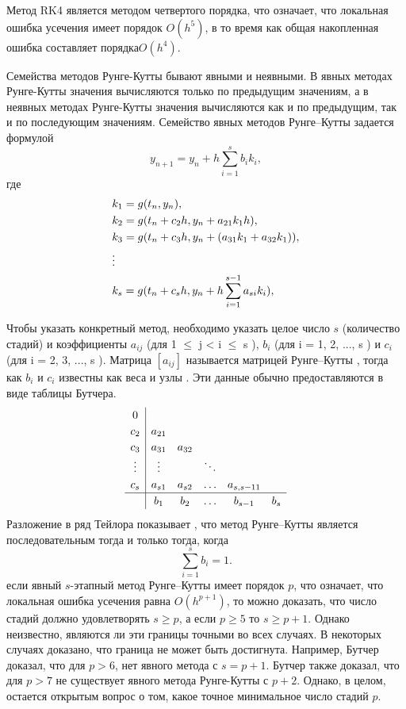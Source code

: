 \documentclass[a4paper,12pt]{article}
\begin{document}
	Метод RK4 является методом четвертого порядка, что означает, что локальная ошибка усечения имеет порядок \(O(h^{5})\), в то время как общая накопленная ошибка составляет порядка\(O(h^{4})\).
	
	Семейства методов Рунге-Кутты бывают явными и неявными. В явных методах Рунге-Кутты значения вычисляются только по предыдущим значениям, а в неявных методах Рунге-Кутты значения вычисляются как и по предыдущим, так и по последующим значениям. Семейство явных методов Рунге–Кутты задается формулой
	\begin{equation}\label{eq:2} 
		y_{n+1}=y_n+h\sum_{i=1}^{s}b_ik_i,
	\end{equation}
	где
	\begin{equation}\label{eq:2} 
		\begin{lgathered} 
			k_1=g(t_n, y_n),\\
			k_2=g(t_n+c_2h, y_n+a_{21}k_1h),\\
			k_3=g(t_n+c_3h, y_n+(a_{31}k_1+a_{32}k_1)),\\
			\vdots\\
			k_s=g(t_n+c_sh, y_n+h\sum_{i=1}^{s-1}a_{si}k_i),\\
		\end{lgathered}
	\end{equation}
	
	Чтобы указать конкретный метод, необходимо указать целое число \(s\) (количество стадий) и коэффициенты \(a_{ij}\) (для 1 \(\leq\) j < i \(\leq\) s ), \(b_i\) (для i = 1, 2, ..., s ) и \(c_i\) (для i = 2, 3, ..., s ). Матрица \([a_{ij}]\) называется матрицей Рунге–Кутты , тогда как \(b_i\) и \(c_i\) известны как веса и узлы . Эти данные обычно предоставляются в виде таблицы Бутчера.
	\[
	\renewcommand\arraystretch{1.2}
	\begin{array}
		{c|ccccc}
		0\\
		c_2 &a_{21}\\
		c_3 &a_{31} &a_{32}\\
		\vdots &\vdots & &\ddots\\
		c_s& a_{s1} &a_{s2}& \ldots&a_{s,s-11}\\
		\hline
		& b_1 &b_2 &\ldots &b_{s-1} &b_s
	\end{array}
	\]
	Разложение в ряд Тейлора показывает , что метод Рунге–Кутты является последовательным тогда и только тогда, когда
	\begin{equation}\label{eq:2} 
		\sum_{i=1}^{s}b_i=1.
	\end{equation}
	 если явный \(s\)-этапный метод Рунге–Кутты имеет порядок \(p\), что означает, что локальная ошибка усечения равна \(O(h^{p+1})\), то можно доказать, что число стадий должно удовлетворять \(s\geq p\), а если \(p\geq 5\) то \(s\geq p+1\). Однако неизвестно, являются ли эти границы точными во всех случаях. В некоторых случаях доказано, что граница не может быть достигнута. Например, Бутчер доказал, что для \(p>6\), нет явного метода с \(s=p+1\). Бутчер также доказал, что для \(p>7\) не существует явного метода Рунге-Кутты с \(p+2\). Однако, в целом, остается открытым вопрос о том, какое точное минимальное число стадий \(p\).
	 
\end{document}
